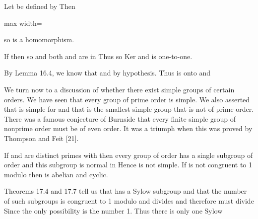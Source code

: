\documentclass[11pt,oneside]{article}
\begin{document}
\begin{BookBody}
Let  be defined by  Then

\begin{center}\begin{adjustbox}{max width=\linewidth}\end{adjustbox}\end{center}

\noindent so \BookInline{\phi } is a homomorphism.

If  then  so  and both  and  are in  Thus   so Ker and \BookInline{\phi } is one-to-one.

By Lemma 16.4, we know that  and  by hypothesis. Thus \BookInline{\phi } is onto  and \BookEnd{\blacklozenge}

\noindent We turn now to a discussion of whether there exist simple groups of certain orders. We have seen that every group of prime order is simple. We also asserted that  is simple for  and that  is the smallest simple group that is not of prime order. There was a famous conjecture of Burnside that every finite simple group of nonprime order must be of even order. It was a triumph when this was proved by Thompson and Feit [21].

 If  and  are distinct primes with  then every group  of order  has a single subgroup of order  and this subgroup is normal in  Hence  is not simple. If  is not congruent to 1 modulo  then  is abelian and cyclic.

 Theorems 17.4 and 17.7 tell us that  has a Sylow subgroup and that the number of such subgroups is congruent to 1 modulo  and divides  and therefore must divide  Since  the only possibility is the number 1. Thus there is only one Sylow

\end{BookBody}
\end{document}
